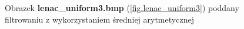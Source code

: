 \documentclass{classrep}
\begin{document}
\begin{figure}
{{  \label{fig.lenac_uniform3_average_5x5}
 }
}
\caption{Obrazek \textbf{lenac\_uniform3.bmp} (\ref{fig.lenac_uniform3}) poddany filtrowaniu z wykorzystaniem średniej arytmetycznej}
\label{fig.lenac_uniform3_average}
\end{figure}
\end{document}
